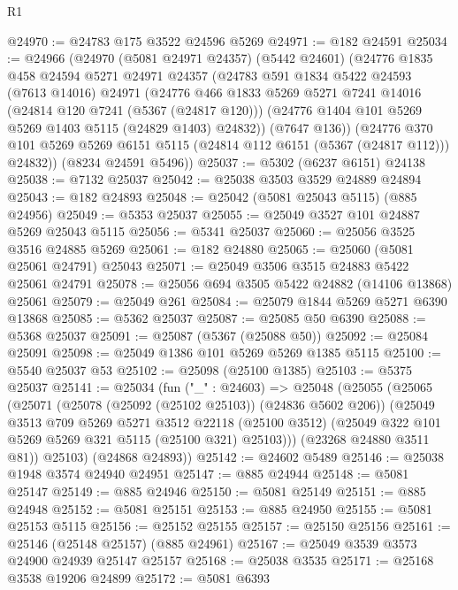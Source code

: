 \begin{lexlean}{R1}
\begin{coremodule}
@24970 := @24783 @175 @3522 @24596 @5269
@24971 := @182 @24591
@25034 := @24966
    (@24970
      (@5081 @24971 @24357)
      (@5442 @24601)
      (@24776
        @1835
        @458
        @24594
        @5271
        @24971
        @24357
        (@24783
          @591
          @1834
          @5422
          @24593
          (@7613 @14016)
          @24971
          (@24776
            @466
            @1833
            @5269
            @5271
            @7241
            @14016
            (@24814 @120 @7241 (@5367 (@24817 @120)))
            (@24776 @1404 @101 @5269 @5269 @1403 @5115 (@24829 @1403) @24832))
          (@7647 @136))
        (@24776 @370 @101 @5269 @5269 @6151 @5115 (@24814 @112 @6151 (@5367 (@24817 @112))) @24832))
      (@8234 @24591 @5496))
@25037 := @5302 (@6237 @6151) @24138
@25038 := @7132 @25037
@25042 := @25038 @3503 @3529 @24889 @24894
@25043 := @182 @24893
@25048 := @25042 (@5081 @25043 @5115) (@885 @24956)
@25049 := @5353 @25037
@25055 := @25049 @3527 @101 @24887 @5269 @25043 @5115
@25056 := @5341 @25037
@25060 := @25056 @3525 @3516 @24885 @5269
@25061 := @182 @24880
@25065 := @25060 (@5081 @25061 @24791) @25043
@25071 := @25049 @3506 @3515 @24883 @5422 @25061 @24791
@25078 := @25056 @694 @3505 @5422 @24882 (@14106 @13868) @25061
@25079 := @25049 @261
@25084 := @25079 @1844 @5269 @5271 @6390 @13868
@25085 := @5362 @25037
@25087 := @25085 @50 @6390
@25088 := @5368 @25037
@25091 := @25087 (@5367 (@25088 @50))
@25092 := @25084 @25091
@25098 := @25049 @1386 @101 @5269 @5269 @1385 @5115
@25100 := @5540 @25037 @53
@25102 := @25098 (@25100 @1385)
@25103 := @5375 @25037
@25141 := @25034
    (fun ("_" : @24603) =>
    @25048
      (@25055
        (@25065
          (@25071
            (@25078 (@25092 (@25102 @25103)) (@24836 @5602 @206))
            (@25049
              @3513
              @709
              @5269
              @5271
              @3512
              @22118
              (@25100 @3512)
              (@25049 @322 @101 @5269 @5269 @321 @5115 (@25100 @321) @25103)))
          (@23268 @24880 @3511 @81))
        @25103)
      (@24868 @24893))
@25142 := @24602 @5489
@25146 := @25038 @1948 @3574 @24940 @24951
@25147 := @885 @24944
@25148 := @5081 @25147
@25149 := @885 @24946
@25150 := @5081 @25149
@25151 := @885 @24948
@25152 := @5081 @25151
@25153 := @885 @24950
@25155 := @5081 @25153 @5115
@25156 := @25152 @25155
@25157 := @25150 @25156
@25161 := @25146 (@25148 @25157) (@885 @24961)
@25167 := @25049 @3539 @3573 @24900 @24939 @25147 @25157
@25168 := @25038 @3535
@25171 := @25168 @3538 @19206 @24899
@25172 := @5081 @6393

\end{coremodule}
\end{lexlean}
